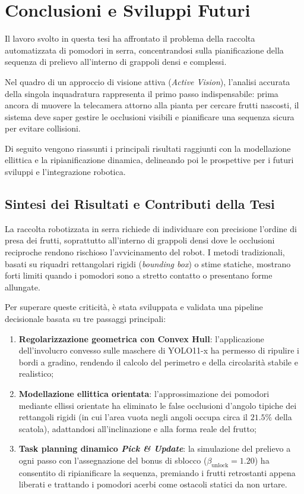 \chapter{Conclusioni e Sviluppi Futuri}
\label{chap:conclusioni}

Il lavoro svolto in questa tesi ha affrontato il problema della raccolta 
automatizzata di pomodori in serra, concentrandosi sulla pianificazione 
della sequenza di prelievo all'interno di grappoli densi e complessi.

Nel quadro di un approccio di visione attiva (\textit{Active Vision}), l'analisi accurata 
della singola inquadratura rappresenta il primo passo indispensabile: prima ancora di 
muovere la telecamera attorno alla pianta per cercare frutti nascosti, il sistema deve 
saper gestire le occlusioni visibili e pianificare una sequenza sicura per evitare collisioni.

Di seguito vengono riassunti i principali risultati raggiunti con la 
modellazione ellittica e la ripianificazione dinamica, delineando poi 
le prospettive per i futuri sviluppi e l'integrazione robotica.


\section{Sintesi dei Risultati e Contributi della Tesi}
\label{sec:sintesi_risultati}

La raccolta robotizzata in serra richiede di individuare con precisione 
l'ordine di presa dei frutti, soprattutto all'interno di grappoli densi dove 
le occlusioni reciproche rendono rischioso l'avvicinamento del robot. I metodi 
tradizionali, basati su riquadri rettangolari rigidi (\textit{bounding box}) o stime statiche, 
mostrano forti limiti quando i pomodori sono a stretto contatto o presentano forme allungate.

Per superare queste criticità, è stata sviluppata e validata una pipeline 
decisionale basata su tre passaggi principali:
\begin{enumerate}
    \item \textbf{Regolarizzazione geometrica con Convex Hull}: l'applicazione 
    dell'involucro convesso sulle maschere di YOLO11-x ha permesso di ripulire i 
    bordi a gradino, rendendo il calcolo del perimetro e della circolarità stabile 
    e realistico;
    \item \textbf{Modellazione ellittica orientata}: l'approssimazione dei pomodori 
    mediante ellissi orientate ha eliminato le false occlusioni d'angolo tipiche 
    dei rettangoli rigidi (in cui l'area vuota negli angoli occupa circa il $21.5\%$ 
    della scatola), adattandosi all'inclinazione e alla forma reale del frutto;
    \item \textbf{Task planning dinamico \textit{Pick \& Update}}: la simulazione 
    del prelievo a ogni passo con l'assegnazione del bonus di sblocco 
    ($\beta_{\text{unlock}} = 1.20$) ha consentito di ripianificare la sequenza, 
    premiando i frutti retrostanti appena liberati e trattando i pomodori acerbi 
    come ostacoli statici da non urtare.
\end{enumerate}

